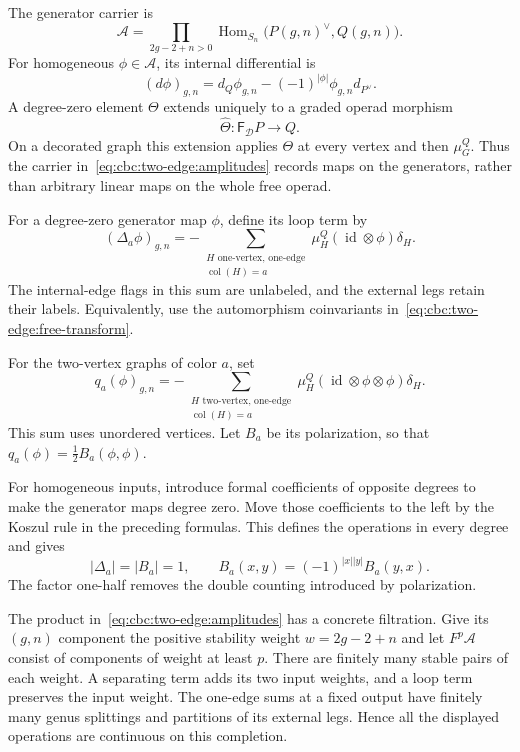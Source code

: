 The generator carrier is
\begin{equation}\label{eq:cbc:two-edge:amplitudes}
 \mathcal A=
 \prod_{2g-2+n>0}
 \operatorname{Hom}_{S_n}\bigl(P(g,n)^\vee,Q(g,n)\bigr).
\end{equation}
For homogeneous $\phi\in\mathcal A$, its internal differential is
\[
 (d\phi)_{g,n}=d_Q\phi_{g,n}-(-1)^{|\phi|}\phi_{g,n}d_{P^\vee}.
\]
A degree-zero element $\Theta$ extends uniquely to a graded operad morphism
\[
 \widehat\Theta:\mathsf F_{\mathcal D}P\longrightarrow Q.
\]
On a decorated graph this extension applies $\Theta$ at every vertex and then $\mu_G^Q$.
Thus the carrier in~\eqref{eq:cbc:two-edge:amplitudes} records maps on the generators, rather than arbitrary linear maps on the whole free operad.

For a degree-zero generator map $\phi$, define its loop term by
\[
 (\Delta_a\phi)_{g,n}
 =-\sum_{\substack{H\text{ one-vertex, one-edge}\\
                   \operatorname{col}(H)=a}}
       \mu_H^Q(\operatorname{id}\otimes\phi)\delta_H.
\]
The internal-edge flags in this sum are unlabeled, and the external legs retain their labels.
Equivalently, use the automorphism coinvariants in~\eqref{eq:cbc:two-edge:free-transform}.

For the two-vertex graphs of color $a$, set
\[
 q_a(\phi)_{g,n}
 =-\sum_{\substack{H\text{ two-vertex, one-edge}\\
                   \operatorname{col}(H)=a}}
       \mu_H^Q(\operatorname{id}\otimes\phi\otimes\phi)\delta_H.
\]
This sum uses unordered vertices.
Let $B_a$ be its polarization, so that $q_a(\phi)=\tfrac12 B_a(\phi,\phi)$.

For homogeneous inputs, introduce formal coefficients of opposite degrees to make the generator maps degree zero.
Move those coefficients to the left by the Koszul rule in the preceding formulas.
This defines the operations in every degree and gives
\[
 |\Delta_a|=|B_a|=1,
 \qquad B_a(x,y)=(-1)^{|x||y|}B_a(y,x).
\]
The factor one-half removes the double counting introduced by polarization.

The product in~\eqref{eq:cbc:two-edge:amplitudes} has a concrete filtration.
Give its $(g,n)$ component the positive stability weight $w=2g-2+n$ and let $F^p\mathcal A$ consist of components of weight at least $p$.
There are finitely many stable pairs of each weight.
A separating term adds its two input weights, and a loop term preserves the input weight.
The one-edge sums at a fixed output have finitely many genus splittings and partitions of its external legs.
Hence all the displayed operations are continuous on this completion.

